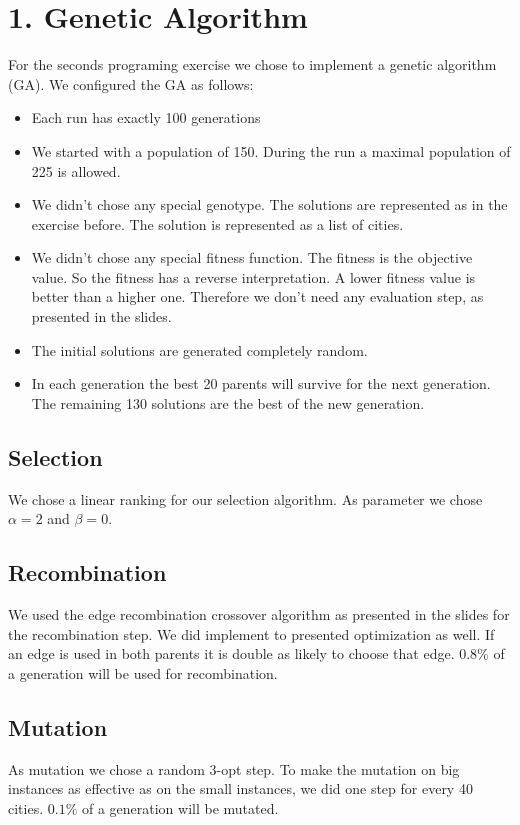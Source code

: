 \section*{1. Genetic Algorithm}

For the seconds programing exercise we chose to implement a genetic algorithm (GA). We configured the GA as follows:
\begin{itemize}
	\item Each run has exactly 100 generations
	\item We started with a population of 150. During the run a maximal population of 225 is allowed.
	\item We didn't chose any special genotype. The solutions are represented as in the exercise before. The solution is represented as a list of cities.
	\item We didn't chose any special fitness function. The fitness is the objective value. So the fitness has a reverse interpretation. A lower fitness value is better than a higher one. Therefore we don't need any evaluation step, as presented in the slides.
	\item The initial solutions are generated completely random.
	\item In each generation the best 20 parents will survive for the next generation. The remaining 130 solutions are the best of the new generation.
\end{itemize}


\subsection*{Selection}
We chose a linear ranking for our selection algorithm. As parameter we chose $\alpha = 2$ and $\beta = 0$.

\subsection*{Recombination}
We used the edge recombination crossover algorithm as presented in the slides for the recombination step. We did implement to presented optimization as well. If an edge is used in both parents it is double as likely to choose that edge. $0.8\%$ of a generation will be used for recombination.

\subsection*{Mutation}
As mutation we chose a random 3-opt step. To make the mutation on big instances as effective as on the small instances, we did one step for every 40 cities. $0.1\%$ of a generation will be mutated.

